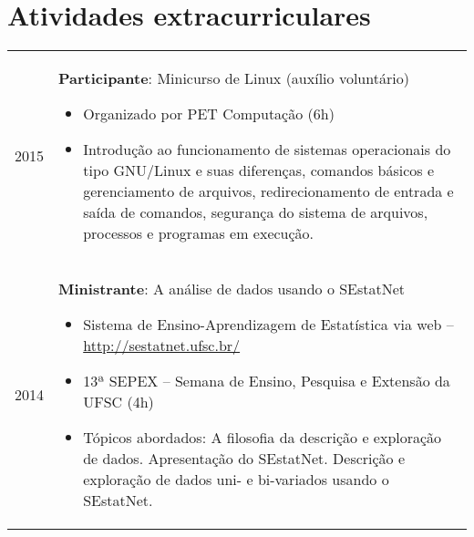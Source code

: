 \documentclass{article}
\newenvironment{contenttable}{
    \newcolumntype{L}{>{\bf \raggedleft}p{0.12\textwidth}}
    \newcolumntype{R}{p{0.84\textwidth}}
    \begin{tabular}{L!{\color{lightgray} \vrule}R}
}{
    \end{tabular}
}
\newenvironment{smallitem}{
    \vspace{-2mm}
    \begin{itemize}
    \setlength{\parskip}{0pt}
    \setlength{\itemsep}{2pt}
}{
    \vspace{-2mm}
    \end{itemize}
}
\begin{document}
\section*{Atividades extracurriculares}
\begin{contenttable}
    2015 & \textbf{Participante}: Minicurso de Linux (auxílio voluntário)
    \begin{smallitem}
        \item Organizado por PET Computação (6h)
        \item Introdução ao funcionamento de sistemas operacionais do tipo
        GNU/Linux e suas diferenças, comandos básicos e gerenciamento de
        arquivos, redirecionamento de entrada e saída de comandos, segurança
        do sistema de arquivos, processos e programas em execução.
    \end{smallitem} \\

    2014 & \textbf{Ministrante}: A análise de dados usando o SEstatNet
    \begin{smallitem}
        \item Sistema de Ensino-Aprendizagem de Estatística via web --
        \url{http://sestatnet.ufsc.br/}
        \item 13ª SEPEX – Semana de Ensino, Pesquisa e Extensão da UFSC (4h)
        \item Tópicos abordados: A filosofia da descrição e exploração de
        dados. Apresentação do SEstatNet. Descrição e exploração de dados uni-
        e bi-variados usando o SEstatNet.
    \end{smallitem}
\end{contenttable}
\end{document}
